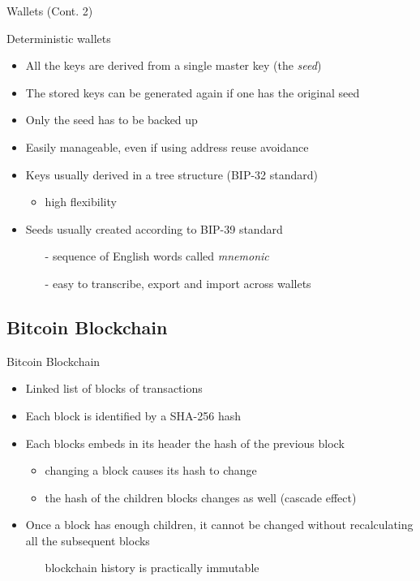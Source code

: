 \documentclass{beamer}
\begin{document}
  \begin{frame}{Wallets (Cont. 2)}
    \begin{block}{Deterministic wallets}
      \begin{itemize}
        \item All the keys are derived from a single master key (the \emph{seed}) 
        \item The stored keys can be generated again if one has the original seed 
        \item Only the seed has to be backed up 
        \item Easily manageable, even if using address reuse avoidance 
        \item Keys usually derived in a tree structure (BIP-32 standard) 
        \begin{itemize}
            \item high flexibility
        \end{itemize}
        \item Seeds usually created according to BIP-39 standard 
        \begin{itemize}
          \item[-] sequence of English words called \emph{mnemonic} 
          \item[-] easy to transcribe, export and import across wallets
        \end{itemize}
      \end{itemize}
    \end{block}
  \end{frame}




  \subsection{Bitcoin Blockchain}
  \begin{frame}{Bitcoin Blockchain}
     \begin{itemize}
         \item Linked list of blocks of transactions
         \item Each block is identified by a SHA-256 hash
         \item Each blocks embeds in its header the hash of the previous block
         \begin{itemize}
             \item changing a block causes its hash to change
             \item the hash of the children blocks changes as well (cascade effect)
         \end{itemize}
         \item Once a block has enough children, it cannot be changed without recalculating all the subsequent blocks
         \begin{itemize}
             \item[\MVRightarrow] blockchain history is practically immutable
         \end{itemize}
     \end{itemize}
  \end{frame}
  
\end{document}
